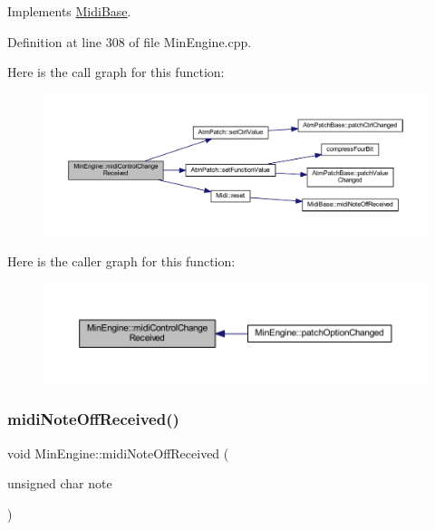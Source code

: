 Implements \hyperlink{class_midi_base_a8364d72d525fd8a766a124ca3230a4c7}{Midi\+Base}.



Definition at line 308 of file Min\+Engine.\+cpp.

Here is the call graph for this function\+:
\nopagebreak
\begin{figure}[H]
\begin{center}
\leavevmode
\includegraphics[width=350pt]{d4/d0f/class_min_engine_ad7404def0db3926e77c8828cab13cca9_cgraph}
\end{center}
\end{figure}
Here is the caller graph for this function\+:
\nopagebreak
\begin{figure}[H]
\begin{center}
\leavevmode
\includegraphics[width=350pt]{d4/d0f/class_min_engine_ad7404def0db3926e77c8828cab13cca9_icgraph}
\end{center}
\end{figure}
\mbox{\label{class_min_engine_aaab036105fa3dce51cc8c8345f2edcfe}} 
\subsubsection{\texorpdfstring{midi\+Note\+Off\+Received()}{midiNoteOffReceived()}}
{\footnotesize\ttfamily void Min\+Engine\+::midi\+Note\+Off\+Received (\begin{DoxyParamCaption}\item[{unsigned char}]{note }\end{DoxyParamCaption})\hspace{0.3cm}{\ttfamily [virtual]}}



